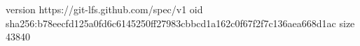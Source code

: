 version https://git-lfs.github.com/spec/v1
oid sha256:b78eecfd125a0fd6c6145250ff27983cbbcd1a162c0f67f2f7c136aea668d1ac
size 43840
